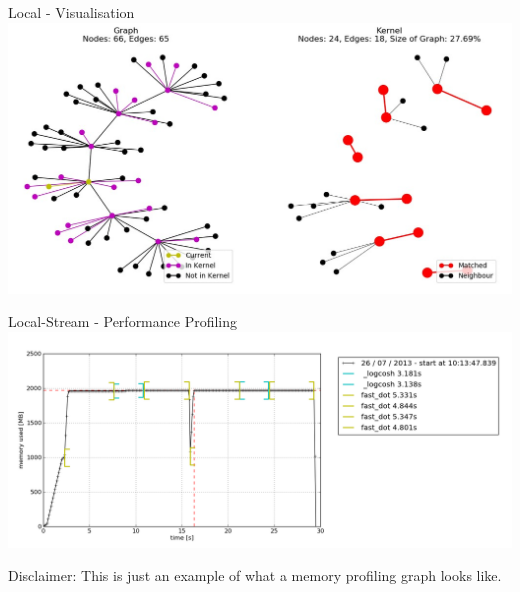 \documentclass{beamer}
\begin{document}
\begin{frame}{\alert{Local} - Visualisation}
    \includegraphics[width=\textwidth]{demo_kernel.jpg}
\end{frame}

\begin{frame}{\alert{Local-Stream} - Performance Profiling}
    \includegraphics[width=\textwidth]{memory-profiler}

    \hfill

    Disclaimer: This is just an example of what a memory profiling graph looks like.
\end{frame}
\end{document}
